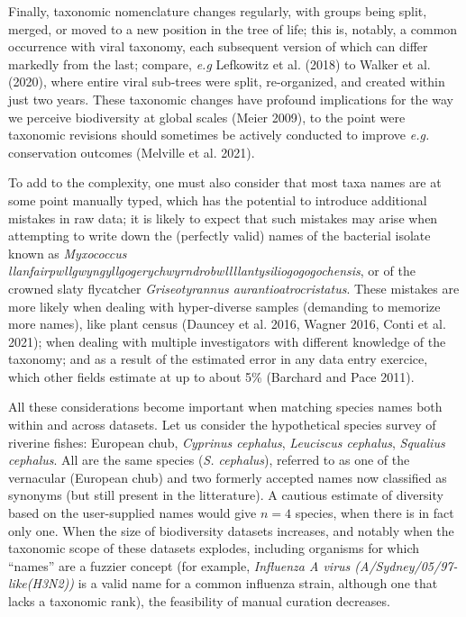\documentclass[10pt,oneside]{article}
\begin{document}
Finally, taxonomic nomenclature changes regularly, with groups being
split, merged, or moved to a new position in the tree of life; this is,
notably, a common occurrence with viral taxonomy, each subsequent
version of which can differ markedly from the last; compare, \emph{e.g}
Lefkowitz et al. (2018) to Walker et al. (2020), where entire viral
sub-trees were split, re-organized, and created within just two years.
These taxonomic changes have profound implications for the way we
perceive biodiversity at global scales (Meier 2009), to the point were
taxonomic revisions should sometimes be actively conducted to improve
\emph{e.g.} conservation outcomes (Melville et al. 2021).

To add to the complexity, one must also consider that most taxa names
are at some point manually typed, which has the potential to introduce
additional mistakes in raw data; it is likely to expect that such
mistakes may arise when attempting to write down the (perfectly valid)
names of the bacterial isolate known as \emph{Myxococcus
llanfairpwllgwyngyllgogerychwyrndrobwllllantysiliogogogochensis}, or of
the crowned slaty flycatcher \emph{Griseotyrannus
aurantioatrocristatus}. These mistakes are more likely when dealing with
hyper-diverse samples (demanding to memorize more names), like plant
census (Dauncey et al. 2016, Wagner 2016, Conti et al. 2021); when
dealing with multiple investigators with different knowledge of the
taxonomy; and as a result of the estimated error in any data entry
exercice, which other fields estimate at up to about 5\% (Barchard and
Pace 2011).

All these considerations become important when matching species names
both within and across datasets. Let us consider the hypothetical
species survey of riverine fishes: European chub, \emph{Cyprinus
cephalus}, \emph{Leuciscus cephalus}, \emph{Squalius cephalus}. All are
the same species (\emph{S. cephalus}), referred to as one of the
vernacular (European chub) and two formerly accepted names now
classified as synonyms (but still present in the litterature). A
cautious estimate of diversity based on the user-supplied names would
give \(n=4\) species, when there is in fact only one. When the size of
biodiversity datasets increases, and notably when the taxonomic scope of
these datasets explodes, including organisms for which ``names'' are a
fuzzier concept (for example, \emph{Influenza A virus
(A/Sydney/05/97-like(H3N2))} is a valid name for a common influenza
strain, although one that lacks a taxonomic rank), the feasibility of
manual curation decreases.
\end{document}
